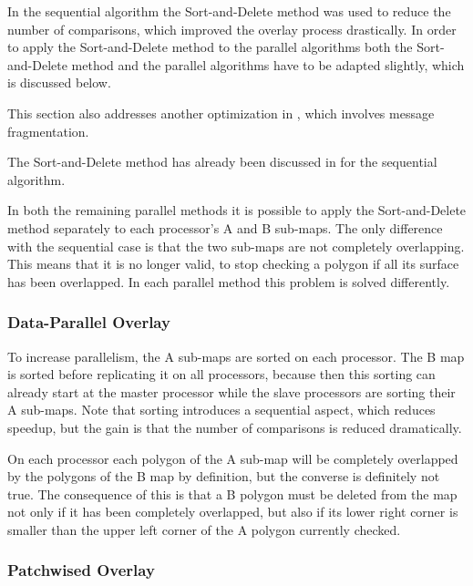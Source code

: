 
In the sequential algorithm the Sort-and-Delete method was used to
reduce the number of comparisons, which improved the overlay process
drastically.
In order to apply the Sort-and-Delete method to the parallel algorithms
both the Sort-and-Delete method and the parallel algorithms have to be
adapted slightly, which is discussed below.

This section also addresses another optimization in
, which involves message fragmentation.



The Sort-and-Delete method has already been discussed in
 for the sequential algorithm.

In both the remaining parallel methods it is possible to apply
the Sort-and-Delete method separately to each processor's A and B
sub-maps.
The only difference with the sequential case is that the two sub-maps
are not completely overlapping.
This means that it is no longer valid, to 
stop checking a polygon if all its surface has been overlapped.
In each parallel method this problem is solved differently.

\subsubsection{Data-Parallel Overlay}

To increase parallelism, the A sub-maps are sorted on each
processor.
The B map is sorted before replicating it on all processors,
because then this sorting can already start at the master processor
while the slave processors are sorting their A sub-maps.
Note that sorting introduces a sequential aspect, which reduces
speedup, but the gain is that the number of comparisons is reduced
dramatically.

On each processor each polygon of the A sub-map will be completely
overlapped by the polygons of the B map by definition, but the
converse is definitely not true.
The consequence of this is that a B polygon must be deleted from the
map not only if it has been completely overlapped, but also if
its lower right corner is smaller than the upper left corner of the A
polygon currently checked.


\subsubsection{Patchwised Overlay}


